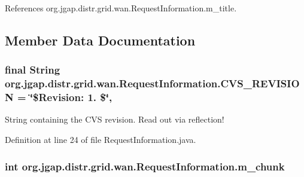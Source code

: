 References org.\-jgap.\-distr.\-grid.\-wan.\-Request\-Information.\-m\-\_\-title.



\subsection{Member Data Documentation}
\hypertarget{classorg_1_1jgap_1_1distr_1_1grid_1_1wan_1_1_request_information_ad476144eacd7f463ff279bc74efdcf97}{
\subsubsection[{C\-V\-S\-\_\-\-R\-E\-V\-I\-S\-I\-O\-N}]{\setlength{\rightskip}{0pt plus 5cm}final String org.\-jgap.\-distr.\-grid.\-wan.\-Request\-Information.\-C\-V\-S\-\_\-\-R\-E\-V\-I\-S\-I\-O\-N = \char`\"{}\$Revision\-: 1. \$\char`\"{}\hspace{0.3cm}{\ttfamily [static]}, {\ttfamily [private]}}}\label{classorg_1_1jgap_1_1distr_1_1grid_1_1wan_1_1_request_information_ad476144eacd7f463ff279bc74efdcf97}
String containing the C\-V\-S revision. Read out via reflection! 

Definition at line 24 of file Request\-Information.\-java.

\hypertarget{classorg_1_1jgap_1_1distr_1_1grid_1_1wan_1_1_request_information_a28825b1d55c2c607dc4646e9a8590245}{
\subsubsection[{m\-\_\-chunk}]{\setlength{\rightskip}{0pt plus 5cm}int org.\-jgap.\-distr.\-grid.\-wan.\-Request\-Information.\-m\-\_\-chunk\hspace{0.3cm}{\ttfamily [private]}}}\label{classorg_1_1jgap_1_1distr_1_1grid_1_1wan_1_1_request_information_a28825b1d55c2c607dc4646e9a8590245}


